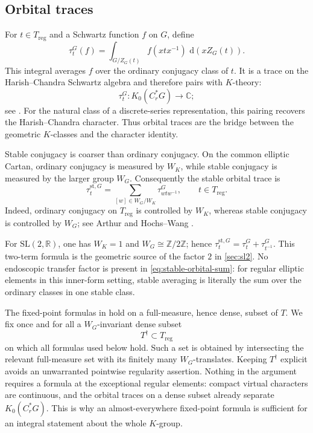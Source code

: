 \documentclass[11pt]{amsart}
\theoremstyle{definition}
\theoremstyle{remark}
\newcommand{\C}{\mathbb C}
\newcommand{\Cr}{C_r^*}
\newcommand{\reg}{\mathrm{reg}}
\newcommand{\st}{\mathrm{st}}
\newcommand{\dd}{\,\mathrm d}
\begin{document}
\subsection{Orbital traces}

For \(t\in T_{\reg}\) and a Schwartz function \(f\) on \(G\), define
\[
  \tau_t^G(f)
  =\int_{G/Z_G(t)} f(xtx^{-1})\,\dd(xZ_G(t)).
\]
This integral averages \(f\) over the ordinary conjugacy class of \(t\).  It is
a trace on the Harish--Chandra Schwartz algebra and therefore pairs with
\(K\)-theory:
\[
  \tau_t^G:K_0(\Cr G)\longrightarrow\C;
\]
see \cite[Sections~2--3]{HochsWang2019Orbital}.  For the natural class of a
discrete-series representation, this pairing recovers the Harish--Chandra
character.  Thus orbital traces are the bridge between the geometric
\(K\)-classes and the character identity.

Stable conjugacy is coarser than ordinary conjugacy.  On the common elliptic
Cartan, ordinary conjugacy is measured by \(W_K\), while stable conjugacy is
measured by the larger group \(W_G\).  Consequently the stable orbital trace is
\begin{equation}\label{eq:stable-orbital-sum}
  \tau_t^{\st,G}
  =\sum_{[w]\in W_G/W_K}\tau_{wtw^{-1}}^G,
  \qquad t\in T_{\reg}.
\end{equation}
Indeed, ordinary conjugacy on $T_{\reg}$ is controlled by $W_K$, whereas stable conjugacy is controlled by $W_G$; see Arthur \cite[Section~27, p.~194]{Arthur2005} and Hochs--Wang \cite[Lemma~6.10]{HochsWang2019Orbital}.

For \(\mathrm{SL}(2,\mathbb R)\), one has \(W_K=1\) and
\(W_G\cong\mathbb Z/2\mathbb Z\); hence
\(\tau_t^{\mathrm{st},G}=\tau_t^G+\tau_{t^{-1}}^G\).  This two-term formula is
the geometric source of the factor \(2\) in \cref{sec:sl2}.  No endoscopic
transfer factor is present in \eqref{eq:stable-orbital-sum}: for regular
elliptic elements in this inner-form setting, stable averaging is literally the
sum over the ordinary classes in one stable class.

The fixed-point formulas in \cite[Theorem~3.2 and Section~6]{HochsWang2019Orbital} hold on a full-measure, hence dense, subset of $T$.  We fix once and for all a $W_G$-invariant dense subset
\[
  T^\dagger\subset T_{\reg}
\]
on which all formulas used below hold.  Such a set is obtained by intersecting the relevant full-measure set with its finitely many $W_G$-translates.  Keeping \(T^\dagger\) explicit avoids an unwarranted pointwise regularity assertion.  Nothing in the argument requires a formula at the exceptional regular elements: compact virtual characters are continuous, and the orbital traces on a dense subset already separate \(K_0(\Cr G)\).  This is why an almost-everywhere fixed-point formula is sufficient for an integral statement about the whole \(K\)-group.
\end{document}
